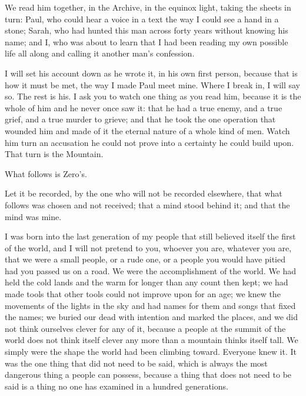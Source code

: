 
We read him together, in the Archive, in the equinox light, taking the sheets in turn: Paul, who could hear a voice in a text the way I could see a hand in a stone; Sarah, who had hunted this man across forty years without knowing his name; and I, who was about to learn that I had been reading my own possible life all along and calling it another man's confession.\par

I will set his account down as he wrote it, in his own first person, because that is how it must be met, the way I made Paul meet mine. Where I break in, I will say so. The rest is his. I ask you to watch one thing as you read him, because it is the whole of him and he never once saw it: that he had a true enemy, and a true grief, and a true murder to grieve; and that he took the one operation that wounded him and made of it the eternal nature of a whole kind of men. Watch him turn an accusation he could not prove into a certainty he could build upon. That turn is the Mountain.\par

What follows is Zero's.\par

\ornament

Let it be recorded, by the one who will not be recorded elsewhere, that what follows was chosen and not received; that a mind stood behind it; and that the mind was mine.\par

I was born into the last generation of my people that still believed itself the first of the world, and I will not pretend to you, whoever you are, whatever you are, that we were a small people, or a rude one, or a people you would have pitied had you passed us on a road. We were the accomplishment of the world. We had held the cold lands and the warm for longer than any count then kept; we had made tools that other tools could not improve upon for an age; we knew the movements of the lights in the sky and had names for them and songs that fixed the names; we buried our dead with intention and marked the places, and we did not think ourselves clever for any of it, because a people at the summit of the world does not think itself clever any more than a mountain thinks itself tall. We simply were the shape the world had been climbing toward. Everyone knew it. It was the one thing that did not need to be said, which is always the most dangerous thing a people can possess, because a thing that does not need to be said is a thing no one has examined in a hundred generations.\par

